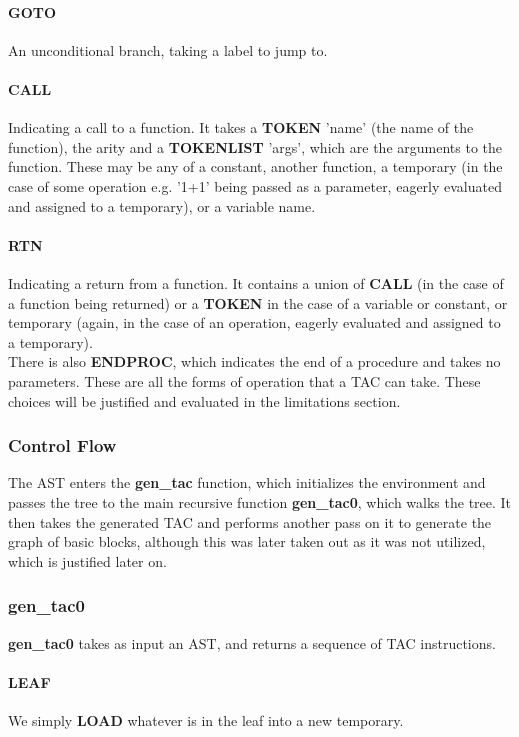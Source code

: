 \documentclass[12pt]{article}
\begin{document}
\paragraph{GOTO} An unconditional branch, taking a label to jump to.
\paragraph{CALL} Indicating a call to a function. It takes a \textbf{TOKEN} 'name' (the name of the function), the arity and a \textbf{TOKENLIST} 'args', which are the arguments to the function. These may be any of a constant, another function, a temporary (in the case of some operation e.g. '1+1' being passed as a parameter, eagerly evaluated and assigned to a temporary), or a variable name.
\paragraph{RTN} Indicating a return from a function. It contains a union of \textbf{CALL} (in the case of a function being returned) or a \textbf{TOKEN} in the case of a variable or constant, or temporary (again, in the case of an operation, eagerly evaluated and assigned to a temporary).
\\\newline There is also \textbf{ENDPROC}, which indicates the end of a procedure and takes no parameters. These are all the forms of operation that a TAC can take. These choices will be justified and evaluated in the limitations section. 
\subsubsection{Control Flow}
  The AST enters the \textbf{gen\_tac} function, which initializes the environment and passes the tree to the main recursive function \textbf{gen\_tac0}, which walks the tree. It then takes the generated TAC and performs another pass on it to generate the graph of basic blocks, although this was later taken out as it was not utilized, which is justified later on. 
\subsubsection{gen\_tac0}
\textbf{gen\_tac0} takes as input an AST, and returns a sequence of TAC instructions. 
\paragraph{LEAF} We simply \textbf{LOAD} whatever is in the leaf into a new temporary.
\end{document}

